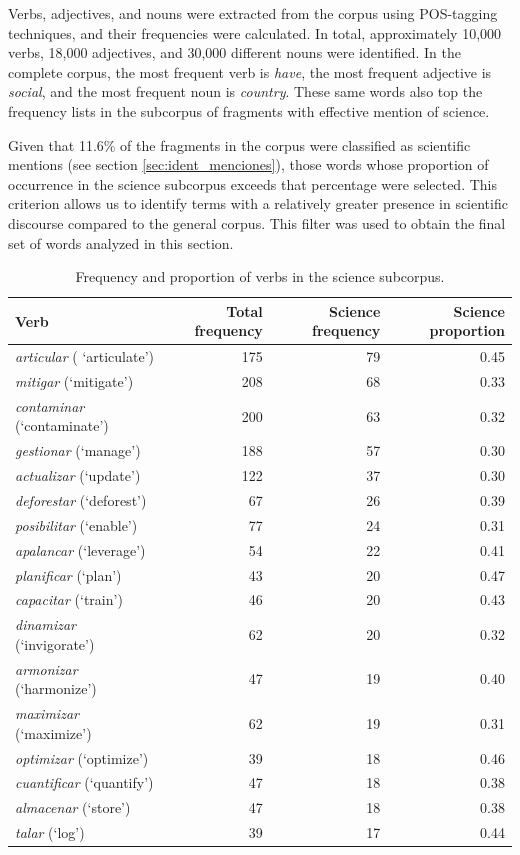 \documentclass[11pt,a4paper]{article}
\begin{document}
Verbs, adjectives, and nouns were extracted from the corpus using POS-tagging techniques, and their frequencies were calculated. In total, approximately 10,000 verbs, 18,000 adjectives, and 30,000 different nouns were identified. In the complete corpus, the most frequent verb is \textit{have}, the most frequent adjective is \textit{social}, and the most frequent noun is \textit{country}. These same words also top the frequency lists in the subcorpus of fragments with effective mention of science.

Given that 11.6\% of the fragments in the corpus were classified as scientific mentions (see section \ref{sec:ident_menciones}), those words whose proportion of occurrence in the science subcorpus exceeds that percentage were selected. This criterion allows us to identify terms with a relatively greater presence in scientific discourse compared to the general corpus. This filter was used to obtain the final set of words analyzed in this section.



\begin{table}[H]
	\centering
	\caption{Frequency and proportion of verbs in the science subcorpus.}
	\begin{tabular}{lrrr}
		\toprule
		\textbf{Verb} & \textbf{Total frequency} & \textbf{Science frequency} & \textbf{Science proportion} \\
		\midrule
		\textit{articular} ( `articulate')    & 175 & 79 & 0.45 \\
		\textit{mitigar} (`mitigate')        & 208 & 68 & 0.33 \\
		\textit{contaminar} (`contaminate')  & 200 & 63 & 0.32 \\
		\textit{gestionar} (`manage')        & 188 & 57 & 0.30 \\
		\textit{actualizar} (`update')       & 122 & 37 & 0.30 \\
		\textit{deforestar} (`deforest')     & 67  & 26 & 0.39 \\
		\textit{posibilitar} (`enable')      & 77  & 24 & 0.31 \\
		\textit{apalancar} (`leverage')      & 54  & 22 & 0.41 \\
		\textit{planificar} (`plan')         & 43  & 20 & 0.47 \\
		\textit{capacitar} (`train')         & 46  & 20 & 0.43 \\
		\textit{dinamizar} (`invigorate')    & 62  & 20 & 0.32 \\
		\textit{armonizar} (`harmonize')     & 47  & 19 & 0.40 \\
		\textit{maximizar} (`maximize')      & 62  & 19 & 0.31 \\
		\textit{optimizar} (`optimize')      & 39  & 18 & 0.46 \\
		\textit{cuantificar} (`quantify')    & 47  & 18 & 0.38 \\
		\textit{almacenar} (`store')         & 47  & 18 & 0.38 \\
		\textit{talar} (`log')               & 39  & 17 & 0.44 \\
		\bottomrule
	\end{tabular}
	
	\label{tab:verbos_ciencia}
\end{table}
\end{document}
